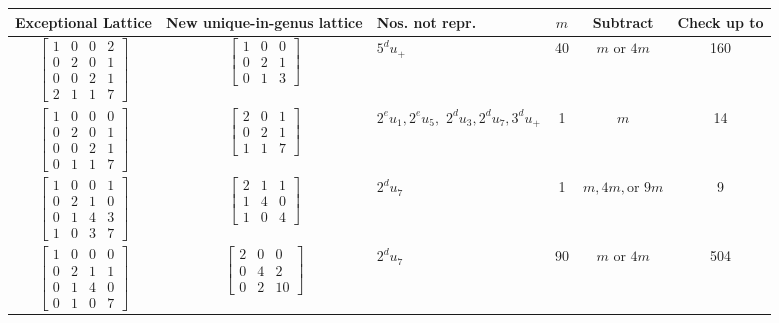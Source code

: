 \documentclass[10pt, letterpaper]{article}
\begin{document}
\begin{table}[ht]
    \centering
    \begin{tabular}{|c|c|p{1in}|c|c|c|}
    \hline
    Exceptional Lattice & New unique-in-genus lattice & Nos. not repr. & $m$ & Subtract & Check up to \\
    \hline
    $\begin{bmatrix} 1 & 0 & 0 & 2 \\ 0 & 2 & 0 & 1 \\ 0 & 0 & 2 & 1 \\ 2 & 1 & 1 & 7 \end{bmatrix}$ & $\begin{bmatrix} 1 & 0 & 0 \\ 0 & 2 & 1 \\ 0 & 1 & 3 \end{bmatrix}$ & $5^d u_+$ & 40 & $m$ or $4m$ & 160 \\
    \hline
    $\begin{bmatrix} 1 & 0 & 0 & 0 \\ 0 & 2 & 0 & 1 \\ 0 & 0 & 2 & 1 \\ 0 & 1 & 1 & 7 \end{bmatrix}$ & $\begin{bmatrix} 2 & 0 & 1 \\ 0 & 2 & 1 \\ 1 & 1 & 7 \end{bmatrix}$ & $2^e u_1, 2^e u_5,$ \newline $2^d u_3, 2^d u_7, 3^d u_+$ & 1 & $m$ & 14 \\ \hline
    $\begin{bmatrix} 1 & 0 & 0 & 1 \\ 0 & 2 & 1 & 0 \\ 0 & 1 & 4 & 3 \\ 1 & 0 & 3 & 7 \end{bmatrix}$ & $\begin{bmatrix} 2 & 1 & 1 \\ 1 & 4 & 0 \\ 1 & 0 & 4 \end{bmatrix}$ & $2^d u_7$ & 1 & $m, 4m, \text{or } 9m$ & 9 \\
    \hline
    $\begin{bmatrix} 1 & 0 & 0 & 0 \\ 0 & 2 & 1 & 1 \\ 0 & 1 & 4 & 0 \\ 0 & 1 & 0 & 7 \end{bmatrix}$ \footnotemark & $\begin{bmatrix} 2 & 0 & 0 \\ 0 & 4 & 2 \\ 0 & 2 & 10 \end{bmatrix}$ & $2^d u_7$ & 90 & $m \text{ or } 4m$ & 504 \\

\end{tabular}
\end{table}
\end{document}
